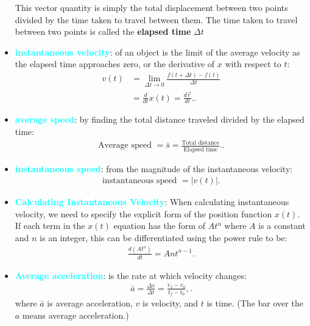 \documentclass{report}
\begin{document}
\begin{itemize}
            This vector quantity is simply the total displacement between two points divided by the time taken to travel between them. The time taken to travel between two points is called the \textbf{elapsed time} $\Delta t$
        \item \textbf{\textcolor{cyan}{instantaneous velocity}}: of an object is the limit of the average velocity as the elapsed time approaches zero, or the derivative of $x$ with respect to $t$:
            \begin{align*}
                v(t) &= \lim\limits_{\Delta t \to 0}{\frac{f(t + \Delta t) - f(t)}{\Delta t}} \\
                 &= \frac{d}{dt}x(t) = \frac{d\vec{r}}{dt}.
            .\end{align*}
        \item \textbf{\textcolor{cyan}{average speed}}: by finding the total distance traveled divided by the elapsed time:
            \begin{align*}
                \text{Average speed } = \bar{s} = \frac{\text{Total distance}}{\text{Elapsed time}}.
            .\end{align*}
        \item \textbf{\textcolor{cyan}{instantaneous speed}}: from the magnitude of the instantaneous velocity:
            \begin{align*}
                \text{instantaneous speed } = \bigg\lvert v(t) \bigg\rvert
            .\end{align*}
        \item \textbf{\textcolor{cyan}{Calculating Instantaneous Velocity}}:
            When calculating instantaneous velocity, we need to specify the explicit form of the position function $x(t)$. If each term in the $x(t)$ equation has the form of $A t^n$ where $A$ is a constant and $n$ is an integer, this can be differentiated using the power rule to be:
            \begin{align*}
                \frac{d(At^{n})}{dt}= Ant^{n-1}
            .\end{align*}
        \item \textbf{\textcolor{cyan}{Average acceleration}}: is the rate at which velocity changes:
            \begin{align*}
                \bar{a} = \frac{\Delta v}{\Delta t} = \frac{v_f - v_0}{t_f - t_0},
            .\end{align*}
            where $\bar{a}$ is average acceleration, $v$ is velocity, and $t$ is time. (The bar over the $a$ means average acceleration.)

\end{itemize}
\end{document}
